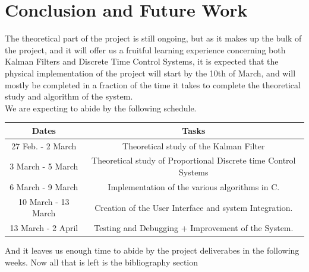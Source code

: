 \documentclass[12pt]{article}
\numberwithin{equation}{section}
\begin{document}
\section{Conclusion and Future Work}
  The theoretical part of the project is still ongoing, but as it makes up the bulk of the project, and it will offer us a fruitful learning experience concerning both Kalman Filters and Discrete Time Control Systems, it is expected that the physical implementation of the project will start by the 10th of March, and will mostly be completed in a fraction of the time it takes to complete the theoretical study and algorithm of the system.\\
  We are expecting to abide by the following schedule.
  \begin{table}[H]
    \begin{tabular}{c|c}
      \textbf{Dates} & \textbf{Tasks} \\
      \midrule
      27 Feb. - 2 March & Theoretical study of the Kalman Filter \\
      3 March - 5 March & Theoretical study of Proportional Discrete time Control Systems  \\
      6 March - 9 March & Implementation of the various algorithms in C.\\
      10 March - 13 March & Creation of the User Interface and system Integration. \\
      13 March - 2 April & Testing and Debugging + Improvement of the System. \\
      \bottomrule
    \end{tabular}
  \end{table}
  And it leaves us enough time to abide by the project deliverabes in the following weeks.
  Now all that is left is the bibliography section

  \pagebreak


\nocite{*}
\end{document}
